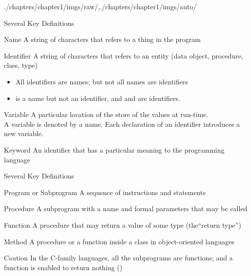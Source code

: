 \begin{graphicspathcontext}{{./chapters/chapter1/imgs/raw/},{./chapters/chapter1/imgs/auto/}}
\begin{bibunit}[apalike]
\begin{frame}[t]{Several Key Definitions}
	\begin{definitionblock}{Name}
		A string of characters that refers to a thing in the program
	\end{definitionblock}
	\begin{definitionblock}{Identifier}
		A string of characters that refers to an entity (data object, procedure, class, type) \begin{itemize}
			\item All identifiers are names; but not all names are identifiers
			\item {} is a name but not an identifier, and  and  are identifiers.
		\end{itemize}
	\end{definitionblock}
	\begin{definitionblock}{Variable}
		A particular location of the store of the values at run-time. \\
		A variable is denoted by a name. Each declaration of an identifier introduces a new variable.
	\end{definitionblock}
	\begin{definitionblock}{Keyword}
		An identifier that has a particular meaning to the programming language
	\end{definitionblock}
\end{frame}

\begin{frame}{Several Key Definitions \insertcontinuationtext}
	\begin{definitionblock}{Program or Subprogram}
		A sequence of instructions and statements
	\end{definitionblock}
	\begin{definitionblock}{Procedure}
		A subprogram with a name and formal parameters that may be called
	\end{definitionblock}
	\begin{definitionblock}{Function}
		A procedure that may return a value of some type (the``return type'')
	\end{definitionblock}
	\begin{definitionblock}{Method}
		A procedure or a function inside a class in object-oriented languages
	\end{definitionblock}
	\begin{alertblock}{Caution}
	In the C-family languages, all the subprograms are functions; and a function is enabled to return nothing ()
	\end{alertblock}
\end{frame}


\end{bibunit}
\end{graphicspathcontext}
